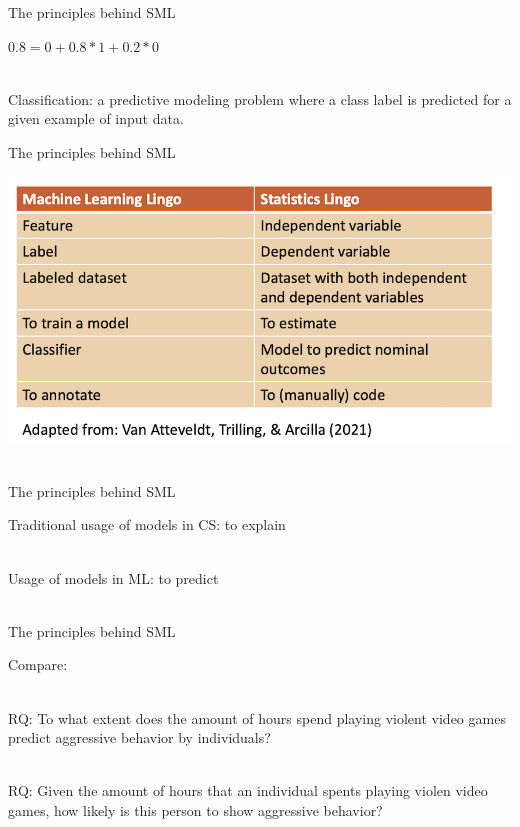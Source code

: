 \documentclass[compress]{beamer}
\begin{document}
\begin{frame}{The principles behind SML} 
	
\(0.8 = 0 + 0.8 * 1 + 0.2 * 0\)\\\

\pause
	
Classification: a predictive modeling problem where a class label is predicted for a given example of input data. 
\end{frame}


\begin{frame}{The principles behind SML}
	
\begin{center}
	\includegraphics[width=\linewidth,height=\textheight,keepaspectratio]{../pictures/MLlingo.png} \\\
\end{center}	
\end{frame}


\begin{frame}[fragile]{The principles behind SML} 
	
Traditional usage of models in CS: to explain \\\
\pause

Usage of models in ML: to predict \\\
\end{frame}

\begin{frame}{The principles behind SML} 
	
Compare: \\\
	
RQ: To what extent does the amount of hours spend playing violent video games predict aggressive behavior by individuals? \\\
	
RQ: Given the amount of hours that an individual spents playing violen video games, how likely is this person to show aggressive behavior?
	
\end{frame}
\end{document}
